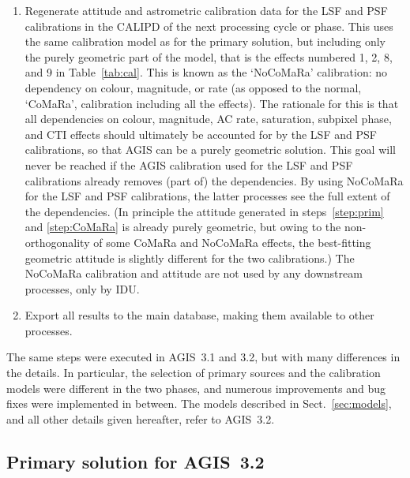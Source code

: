 \documentclass[longauth]{aa} %
\begin{document}
\begin{enumerate}
for the astrometry, but where the observations may still be useful for other processes.
The skymapper (SM) geometry is also calibrated at this point. Although the SM observations 
are not used in the astrometric solution, they are needed in downstream processes.
\item
Regenerate attitude and astrometric calibration data for the LSF and PSF calibrations in the  
CALIPD of the next processing cycle or phase. This uses the same calibration model as for 
the primary solution, but including only the purely geometric part of the model, that is the 
effects numbered 1, 2, 8, and 9 in Table~\ref{tab:cal}. This is known as the `NoCoMaRa' 
calibration: no dependency on colour, magnitude, or rate (as opposed to the normal,
`CoMaRa', calibration including all the effects). The rationale for this is that all 
dependencies on colour, magnitude, AC rate, saturation, subpixel phase, and CTI
effects should ultimately be accounted for by the LSF and PSF calibrations, so that 
AGIS can be a purely geometric solution. This goal will never be reached if the AGIS 
calibration used for the LSF and PSF calibrations already removes (part of) the dependencies. 
By using NoCoMaRa for the LSF and PSF calibrations, the latter processes see the full extent 
of the dependencies. (In principle the attitude generated in steps~\ref{step:prim} and
\ref{step:CoMaRa} is already purely geometric, but owing to the non-orthogonality 
of some CoMaRa and NoCoMaRa effects, the best-fitting geometric attitude is slightly 
different for the two calibrations.) The NoCoMaRa calibration and attitude are not used 
by any downstream processes, only by IDU.
\item
Export all results to the main database, making them available to other processes.
\end{enumerate}
The same steps were executed in AGIS~3.1 and 3.2, but with many differences
in the details. In particular, the selection of primary sources and the calibration models
were different in the two phases, and numerous improvements and bug fixes were 
implemented in between. The models described in Sect.~\ref{sec:models}, and all other 
details given hereafter, refer to AGIS~3.2.

\subsection{Primary solution for AGIS~3.2}
\label{sec:prim}
\end{document}
